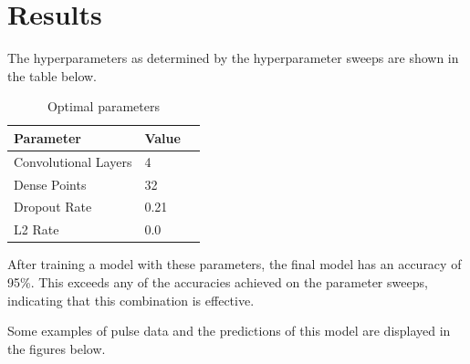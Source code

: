 \documentclass{article}
\begin{document}
\section{Results}

The hyperparameters as determined by the hyperparameter sweeps are shown in the table below. 

\begin{table}[H]
    \caption{Optimal parameters}
    \label{results}
    \centering
    \begin{tabular}{lll}
      \toprule
      Parameter     & Value  \\
      \midrule
      Convolutional Layers & 4     \\
      Dense Points     & 32     \\
      Dropout Rate     & 0.21  \\
      L2 Rate     & 0.0  \\
      \bottomrule
    \end{tabular}
  \end{table}

After training a model with these parameters, the final model has an accuracy of 95\%. This exceeds any of the accuracies achieved on the parameter sweeps, indicating that this combination is effective.

Some examples of pulse data and the predictions of this model are displayed in the figures below.
\end{document}
